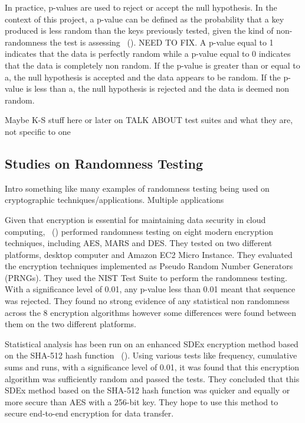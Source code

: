 In practice, p-values are used to reject or accept the null hypothesis. In the context of this project, a p-value can be defined as the probability that a key produced is less random than the keys previously tested, given the kind of non-randomness the test is assessing ~(\cite{1195701}). NEED TO FIX. A p-value equal to 1 indicates that the data is perfectly random while a p-value equal to 0 indicates that the data is completely non random. If the p-value is greater than or equal to a, the null hypothesis is accepted and the data appears to be random. If the p-value is less than a, the null hypothesis is rejected and the data is deemed non random. \newline

Maybe K-S stuff here or later on
TALK ABOUT test suites and what they are, not specific to one

\subsection{Studies on Randomness Testing}
Intro something like many examples of randomness testing being used on cryptographic techniques/applications. Multiple applications \newline

Given that encryption is essential for maintaining data security in cloud computing, ~(\cite{6236554}) performed randomness testing on eight modern encryption techniques, including AES, MARS and DES. They tested on two different platforms, desktop computer and Amazon EC2 Micro Instance. They evaluated the encryption techniques implemented as Pseudo Random Number Generators (PRNGs). They used the NIST Test Suite to perform the randomness testing. With a significance level of 0.01, any p-value less than 0.01 meant that sequence was rejected. They found no strong evidence of any statistical non randomness across the 8 encryption algorithms however some differences were found between them on the two different platforms. \newline

Statistical analysis has been run on an enhanced SDEx encryption method based on the SHA-512 hash function ~(\cite{9209663}). Using various tests like frequency, cumulative sums and runs, with a significance level of 0.01, it was found that this encryption algorithm was sufficiently random and passed the tests. They concluded that this SDEx method based on the SHA-512 hash function was quicker and equally or more secure than AES with a 256-bit key. They hope to use this method to secure end-to-end encryption for data transfer.\newline

